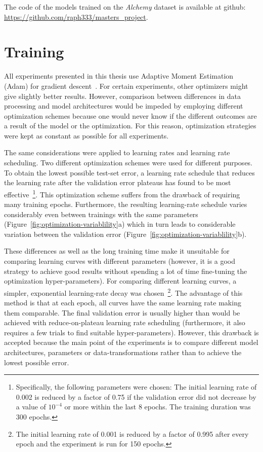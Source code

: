 The code of the models trained on the \textit{Alchemy} dataset is available at github: \url{https://github.com/raph333/masters\_project}.



\section{Training}
\label{sec:training}

All experiments presented in this thesis use Adaptive Moment Estimation (Adam) for gradient descent~\cite{Kingma2015}. For certain experiments, other optimizers might give slightly better results. However, comparison between differences in data processing and model architectures would be impeded by employing different optimization schemes because one would never know if the different outcomes are a result of the model or the optimization. For this reason, optimization strategies were kept as constant as possible for all experiments.

The same considerations were applied to learning rates and learning rate scheduling. Two different optimization schemes were used for different purposes.
To obtain the lowest possible test-set error, a learning rate schedule that reduces the learning rate after the validation error plateaus has found to be most effective~\footnote{\label{fn:reduce-on-plateu}
	Specifically, the following parameters were chosen: The initial learning rate of 0.002 is reduced by a factor of 0.75 if the validation error did not decrease by a value of $10^{-4}$ or more within the last 8 epochs. The training duration was 300 epochs.
}. This optimization scheme suffers from the drawback of requiring many training epochs. Furthermore, the resulting learning-rate schedule varies considerably even between trainings with the same parameters (Figure~\ref{fig:optimization-variablility}a) which in turn leads to considerable variation between the validation error (Figure~\ref{fig:optimization-variablility}b).

These differences as well as the long training time make it unsuitable for comparing learning curves with different parameters (however, it is a good strategy to achieve good results without spending a lot of time fine-tuning the optimization hyper-parameters).
For comparing different learning curves, a simpler, exponential learning-rate decay was chosen~\footnote{
	The initial learning rate of 0.001 is reduced by a factor of 0.995 after every epoch and the experiment is run for 150 epochs.
}. The advantage of this method is that at each epoch, all curves have the same learning rate making them comparable. The final validation error is usually higher than would be achieved with reduce-on-plateau learning rate scheduling (furthermore, it also requires a few trials to find suitable hyper-parameters). However, this drawback is accepted because the main point of the experiments is to compare different model architectures, parameters or data-transformations rather than to achieve the lowest possible error.

